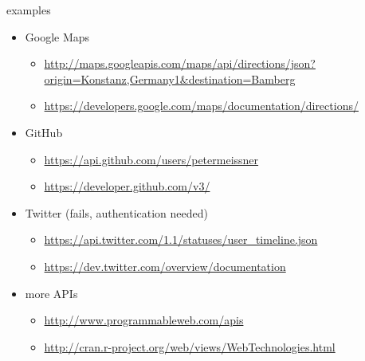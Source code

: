 \documentclass[ignorenonframetext,]{beamer}
\providecommand{\tightlist}{%
  \setlength{\itemsep}{0pt}\setlength{\parskip}{0pt}}
\begin{document}
\begin{frame}{examples}

\begin{itemize}
\tightlist
\item
  Google Maps

  \begin{itemize}
  \tightlist
  \item
    \url{http://maps.googleapis.com/maps/api/directions/json?origin=Konstanz,Germany1\&destination=Bamberg}
  \item
    \url{https://developers.google.com/maps/documentation/directions/}
  \end{itemize}
\item
  GitHub

  \begin{itemize}
  \tightlist
  \item
    \url{https://api.github.com/users/petermeissner}
  \item
    \url{https://developer.github.com/v3/}
  \end{itemize}
\item
  Twitter (fails, authentication needed)

  \begin{itemize}
  \tightlist
  \item
    \url{https://api.twitter.com/1.1/statuses/user_timeline.json}
  \item
    \href{https://api.twitter.com/1.1/statuses/user_timeline.json}{https://dev.twitter.com/overview/documentation}
  \end{itemize}
\item
  more APIs

  \begin{itemize}
  \tightlist
  \item
    \url{http://www.programmableweb.com/apis}
  \item
    \url{http://cran.r-project.org/web/views/WebTechnologies.html}
  \end{itemize}
\end{itemize}

\end{frame}
\end{document}
